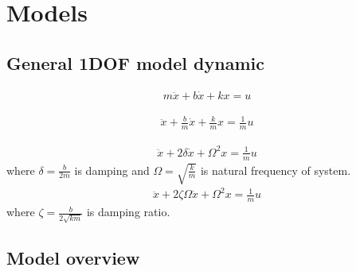\documentclass[class=article, crop=false]{standalone}
\begin{document}

\section{Models}
\subsection{General 1DOF model dynamic}
\begin{align}\label{eq:1dof}
m\ddot{x} +b\dot{x} + kx = u
\end{align}

\begin{align}
    \ddot{x} +\frac{b}{m}\dot{x} + \frac{k}{m}x = \frac{1}{m}u
\end{align}

\begin{align}
    \ddot{x} +2\delta\dot{x} + \Omega^2x = \frac{1}{m}u
\end{align}
where $\delta = \frac{b}{2m}$ is damping and $\Omega = \sqrt{\frac{k}{m}}$
is natural frequency of system.
\begin{align}
    \ddot{x} +2\zeta\Omega\dot{x} + \Omega^2x = \frac{1}{m}u
\end{align}
where $\zeta = \frac{b}{2\sqrt{km}}$ is damping ratio.

\subsection{Model overview}

\end{document}
